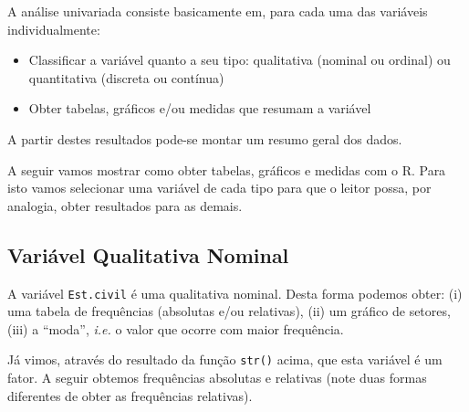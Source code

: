 \documentclass[10pt,a4paper]{book}
\newenvironment{Shaded}{\begin{snugshade}}{\end{snugshade}}
\newcommand{\KeywordTok}[1]{\textcolor[rgb]{0.13,0.29,0.53}{\textbf{#1}}}
\newcommand{\DecValTok}[1]{\textcolor[rgb]{0.00,0.00,0.81}{#1}}
\newcommand{\FloatTok}[1]{\textcolor[rgb]{0.00,0.00,0.81}{#1}}
\newcommand{\StringTok}[1]{\textcolor[rgb]{0.31,0.60,0.02}{#1}}
\newcommand{\OperatorTok}[1]{\textcolor[rgb]{0.81,0.36,0.00}{\textbf{#1}}}
\newcommand{\NormalTok}[1]{#1}
\providecommand{\tightlist}{%
  \setlength{\itemsep}{0pt}\setlength{\parskip}{0pt}}
\begin{document}
A análise univariada consiste basicamente em, para cada uma das
variáveis individualmente:

\begin{itemize}
\tightlist
\item
  Classificar a variável quanto a seu tipo: qualitativa (nominal ou
  ordinal) ou quantitativa (discreta ou contínua)
\item
  Obter tabelas, gráficos e/ou medidas que resumam a variável
\end{itemize}

A partir destes resultados pode-se montar um resumo geral dos dados.

A seguir vamos mostrar como obter tabelas, gráficos e medidas com o R.
Para isto vamos selecionar uma variável de cada tipo para que o leitor
possa, por analogia, obter resultados para as demais.

\subsection{Variável Qualitativa
Nominal}\label{variuxe1vel-qualitativa-nominal}

A variável \texttt{Est.civil} é uma qualitativa nominal. Desta forma
podemos obter: (i) uma tabela de frequências (absolutas e/ou relativas),
(ii) um gráfico de setores, (iii) a ``moda'', \emph{i.e.} o valor que
ocorre com maior frequência.

Já vimos, através do resultado da função \texttt{str()} acima, que esta
variável é um fator. A seguir obtemos frequências absolutas e relativas
(note duas formas diferentes de obter as frequências relativas).

\begin{Shaded}
\end{Shaded}
\end{document}
